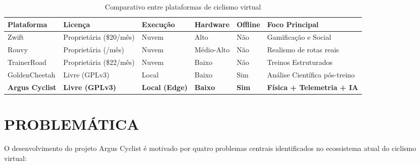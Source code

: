 \documentclass[
    a4paper,
    12pt,
    oneside,
    english,
    brazil,
    chapter=TITLE,
    section=TITLE,
]{abntex2}
\begin{document}
\begin{table}[h]
    \centering
    \caption{Comparativo entre plataformas de ciclismo virtual}
    \label{tab:comparativo}
    \small
    \begin{tabular}{
        >{\raggedright\arraybackslash}p{2.8cm}
        >{\raggedright\arraybackslash}p{2.4cm}
        >{\raggedright\arraybackslash}p{2.2cm}
        >{\raggedright\arraybackslash}p{2cm}
        >{\centering\arraybackslash}p{1.1cm}
        >{\raggedright\arraybackslash}p{3cm}
    }
        \toprule
        \textbf{Plataforma} & \textbf{Licença} & \textbf{Execução} & \textbf{Hardware} & \textbf{Offline} & \textbf{Foco Principal} \\
        \midrule
        Zwift & Proprietária (\$20/mês) & Nuvem & Alto & Não & Gamificação e Social \\
        Rouvy & Proprietária (\texteuro 15/mês) & Nuvem & Médio-Alto & Não & Realismo de rotas reais \\
        TrainerRoad & Proprietária (\$22/mês) & Nuvem & Baixo & Não & Treinos Estruturados \\
        GoldenCheetah & Livre (GPLv3) & Local & Baixo & Sim & Análise Científica pós-treino \\
        \textbf{Argus Cyclist} & \textbf{Livre (GPLv3)} & \textbf{Local (Edge)} & \textbf{Baixo} & \textbf{Sim} & \textbf{Física + Telemetria + IA} \\
        \bottomrule
    \end{tabular}
\end{table}

\chapter{PROBLEMÁTICA}
\label{sec:problematica}

O desenvolvimento do projeto Argus Cyclist é motivado por quatro problemas centrais identificados no ecossistema atual do ciclismo virtual:
\end{document}
